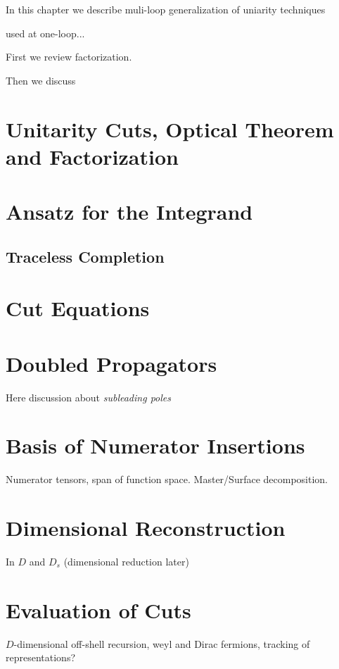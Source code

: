 In this chapter we describe muli-loop generalization of uniarity techniques

used at one-loop...

First we review factorization.

Then we discuss 

\section{Unitarity Cuts, Optical Theorem and Factorization}

\section{Ansatz for the Integrand}
\label{sec:ansatz_integrand}

\subsection{Traceless Completion}
\label{sec:traceless_completion}

\section{Cut Equations}

\section{Doubled Propagators}
Here discussion about \textit{subleading poles}

\section{Basis of Numerator Insertions}
Numerator tensors, span of function space. Master/Surface decomposition.



\section{Dimensional Reconstruction}
 In $D$ and $D_s$ (dimensional reduction later)

\section{Evaluation of Cuts}
$D$-dimensional off-shell recursion, weyl and Dirac fermions, tracking of representations?



